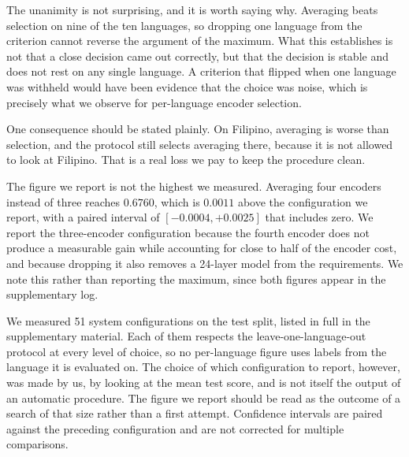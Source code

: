 The unanimity is not surprising, and it is worth saying why. Averaging
beats selection on nine of the ten languages, so dropping one language
from the criterion cannot reverse the argument of the maximum. What
this establishes is not that a close decision came out correctly, but
that the decision is stable and does not rest on any single language. A
criterion that flipped when one language was withheld would have been
evidence that the choice was noise, which is precisely what we observe
for per-language encoder selection.

One consequence should be stated plainly. On Filipino, averaging is
worse than selection, and the protocol still selects averaging there,
because it is not allowed to look at Filipino. That is a real loss we
pay to keep the procedure clean.



The figure we report is not the highest we measured. Averaging four
encoders instead of three reaches $0.6760$, which is $0.0011$ above the
configuration we report, with a paired interval of $[-0.0004, +0.0025]$
that includes zero. We report the three-encoder configuration because
the fourth encoder does not produce a measurable gain while accounting
for close to half of the encoder cost, and because dropping it also
removes a 24-layer model from the requirements. We note this rather
than reporting the maximum, since both figures appear in the
supplementary log.



We measured 51 system configurations on the test split, listed in full
in the supplementary material. Each of them respects the
leave-one-language-out protocol at every level of choice, so no
per-language figure uses labels from the language it is evaluated on.
The choice of which configuration to report, however, was made by us,
by looking at the mean test score, and is not itself the output of an
automatic procedure. The figure we report should be read as the
outcome of a search of that size rather than a first attempt. Confidence
intervals are paired against the preceding configuration and are not
corrected for multiple comparisons.

